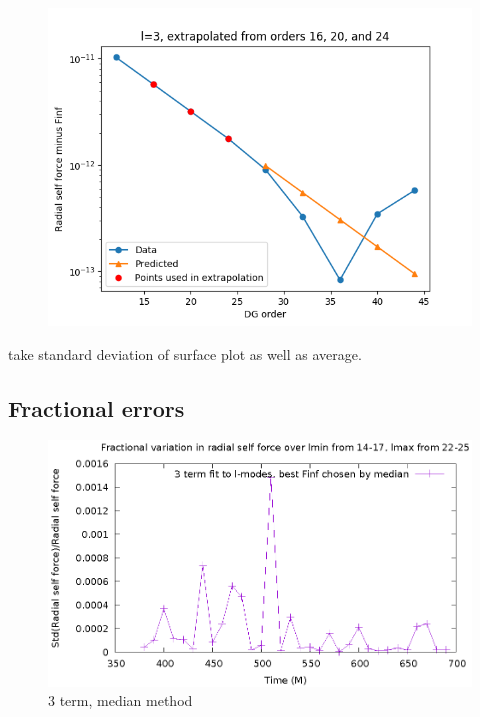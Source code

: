\documentclass{article}
\begin{document}
\begin{figure}
\includegraphics{fittingtechniquet370l3}
\end{figure}

take standard deviation of surface plot as well as average.



\subsection{Fractional errors}
\begin{figure}
  \includegraphics{fractionalErrorSelfForceOverTime3termMedian}
  \caption{3 term, median method}
\end{figure}
\end{document}
